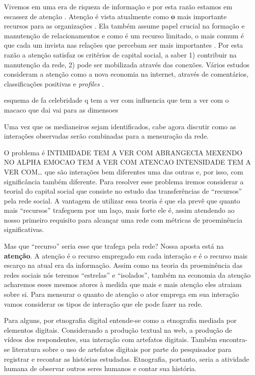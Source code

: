 \documentclass{article}
\begin{document}
Vivemos em uma era de riqueza de informação e por esta razão estamos em escassez
de atenção \cite{Goldhaber1997}. Atenção é vista atualmente como \textbf{o} mais
importante recursos para as organizações \cite{Davenport2001}. Ela também assume
papel crucial na formação e manutenção de relacionamentos e como é um recurso
limitado, o mais comum é que cada um invista nas relações que percebam ser mais
importantes \cite{Dindia1993}. Por esta razão a atenção satisfaz os critérios de
capital social, a saber 1) contribuir na manutenção da rede, 2) pode ser
mobilizada através das conexões. Vários estudos consideram a atenção como a nova
economia na internet, através de comentários, classificações positivas e
\textit{profiles} \cite{Humphreys2009} \cite{Wu2009} \cite{Skageby2009}.

esquema de fa celebridade q tem a ver com influencia que tem a ver com o macaco
que dai vai para as dimensoes

Uma vez que os medianeiros sejam identificados, cabe agora discutir como as
interações observadas serão combinadas para a mensuração da rede. 



O problema é INTIMIDADE TEM A VER COM ABRANGECIA MEXENDO NO ALPHA
EMOCAO TEM A VER COM ATENCAO
INTENSIDADE TEM A VER COM\ldots
que são interações bem diferentes uma das outras e, por isso, com significância
também diferente. Para resolver esse problema iremos considerar a teorial do
capital social que consiste no estudo das transferências de ``recursos'' pela
rede social. A vantagem de utilizar essa teoria é que ela prevê que quanto mais
``recursos'' trafeguem por um laço, mais forte ele é, assim atendendo ao nosso
primeiro requisito para alcançar uma rede com métricas de proeminência
significativas.

Mas que ``recurso'' seria esse que trafega pela rede? Nossa aposta está na
\textbf{atenção}. A atenção é o recurso empregado em cada interação e é o
recurso mais escarço na atual era da informação. Assim como na teoria da
proeminência das redes sociais nós teremos ``estrelas'' e ``isolados'', também
na economia da atenção acharemos esses mesmos atores à medida que mais e mais
atenção eles atraiam sobre si. Para mensurar o quanto de atenção o ator emprega
em sua interação vamos considerar os tipos de interação que ele pode fazer na
rede.

Para alguns, por etnografia digital entende-se como a etnografia mediada por
elementos digitais. Considerando a produção textual na web, a produção de vídeos
dos respondentes, sua interação com artefatos digitais. Também encontra-se
literatura sobre o uso de artefatos digitais por parte do pesquisador para
registrar e recontar as histórias estudadas. Etnografia, portanto, seria a
atividade humana de observar outros seres humanos e contar sua história.
\end{document}
